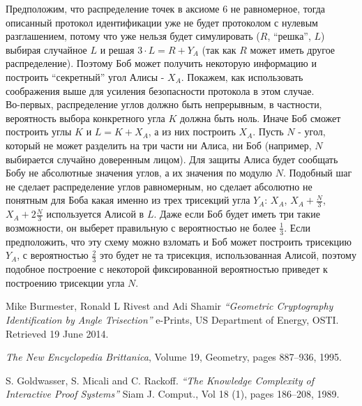 \documentclass{report}%
\begin{document}
\noindent Предположим, что распределение точек в аксиоме 6 не равномерное,
тогда описанный протокол идентификации уже не будет протоколом с нулевым разглашением,
потому что уже нельзя будет симулировать ($R$, ``решка'', $L$) выбирая случайное $L$ и решая
$3 \cdot L = R + Y_A$ (так как $R$ может иметь другое распределение). Поэтому Боб может
получить некоторую информацию и построить ``секретный'' угол Алисы -  $X_A$. Покажем,
как использовать соображения выше для усиления безопасности протокола в этом случае.~\\
Во-первых, распределение углов должно быть непрерывным, в частности, вероятность выбора
конкретного угла $K$ должна быть ноль. Иначе Боб сможет построить углы $K$ и $L = K + X_A$, а
из них построить $X_A$. Пусть $N$ - угол, который не может разделить на три части ни Алиса, ни Боб
(например, $N$ выбирается случайно доверенным лицом).
Для защиты Алиса будет сообщать Бобу не абсолютные значения углов, а их значения по модулю $N$.
Подобный шаг не сделает распределение углов равномерным, но сделает абсолютно не понятным для
Боба какая именно из трех трисекций угла $Y_A$: $X_A$, $X_A + \frac{N}{3}$, $X_A + 2 \frac{N}{3}$
используется Алисой в $L$. Даже если Боб будет иметь три такие возможности, он выберет правильную
с вероятностью не более $\frac{1}{3}$. Если предположить, что эту схему можно взломать и Боб может
построить трисекцию $Y_A$, с вероятностью $\frac{2}{3}$ это будет не та трисекция, использованная Алисой,
поэтому подобное построение с некоторой фиксированной вероятностью приведет к построению трисекции угла $N$.

\begin{thebibliography}{1}

  	 Mike Burmester, Ronald L Rivest and Adi Shamir
  		{\em ``Geometric Cryptography Identification by Angle Trisection''}\quad
  		e-Prints, US Department of Energy, OSTI. Retrieved 19 June 2014.

	 {\em The New Encyclopedia Brittanica}, Volume 19, Geometry, pages 887--936, 1995.
	
	 S. Goldwasser, S. Micali and C. Rackoff.
		{\em ``The Knowledge Complexity of Interactive Proof Systems''}\quad
		Siam J. Comput., Vol 18 (1), pages 186--208, 1989.	
	
\end{thebibliography}
\end{document}
